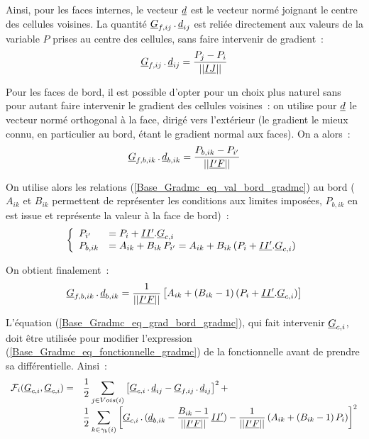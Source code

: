 Ainsi, pour les faces internes, le vecteur $\underline{d}$ est le vecteur norm\'e joignant
le centre des cellules voisines. La quantit\'e
$\underline{G}_{f,ij}\,.\,\underline{d}_{ij}$ est reli\'ee directement aux
valeurs de la variable $P$ prises au centre des cellules, sans faire intervenir
de gradient~: 
\begin{equation}
\underline{G}_{f,ij}\,.\,\underline{d}_{ij}=\frac{P_j-P_i}{||\underline{IJ}||}
\end{equation}

Pour les faces de bord, il est possible d'opter pour un choix plus naturel sans pour 
autant faire intervenir le gradient des cellules voisines~: on utilise pour
$\underline{d}$ le vecteur
norm\'e orthogonal \`a la face, dirig\'e vers l'ext\'erieur (le gradient le
mieux connu, en particulier au bord, \'etant le gradient normal aux faces). 
On a alors~:
\begin{equation}
\underline{G}_{f,b,ik}\,.\,\underline{d}_{b,ik}=\frac{P_{b,ik}-P_{i'}}{||\underline{I'F}||}
\end{equation} 

On utilise alors les relations (\ref{Base_Gradmc_eq_val_bord_gradmc}) au bord ($A_{ik}$ et $B_{ik}$ 
permettent de
repr\'esenter les conditions aux limites impos\'ees, $P_{b,ik}$ en est issue et
repr\'esente la valeur \`a la face de bord)~:
\begin{equation}
\left\{\begin{array}{ll}\label{Base_Gradmc_eq_val_bord_gradmc}
P_{i'}&=P_{i}+\underline{II'}.\underline{G}_{c,i}\\
P_{b,ik}&=A_{ik}+B_{ik}\,P_{i'}=A_{ik}+B_{ik}\,(P_{i}+\underline{II'}.\underline{G}_{c,i})
\end{array}\right.
\end{equation}

On obtient finalement~:
\begin{equation}\label{Base_Gradmc_eq_grad_bord_gradmc}
\underline{G}_{f,b,ik}\,.\,\underline{d}_{b,ik}
=\frac{1}{||\underline{I'F}||}\left[A_{ik}+(B_{ik}-1)\,(P_{i}+\underline{II'}.\underline{G}_{c,i})\right]
\end{equation}

L'\'equation (\ref{Base_Gradmc_eq_grad_bord_gradmc}), qui fait intervenir $\underline{G}_{c,i}$, 
doit \^etre utilis\'ee pour modifier
l'expression (\ref{Base_Gradmc_eq_fonctionnelle_gradmc}) de la fonctionnelle avant de prendre sa 
diff\'erentielle. Ainsi~:
\begin{equation}\label{Base_Gradmc_eq_fonctionnelle_mod_gradmc}
\begin{array}{ll}
\mathcal{F}_i(\underline{G}_{c,i},\underline{G}_{c,i})=&
\displaystyle\frac{1}{2}\sum\limits_{j\in Vois(i)}\left[
\underline{G}_{c,i}\,.\,\underline{d}_{ij}-\underline{G}_{f,ij}\,.\,\underline{d}_{ij}
\right]^2+\\
&\displaystyle\frac{1}{2}\sum\limits_{k\in \gamma_b(i)}\left[
\underline{G}_{c,i}\,.\,(\underline{d}_{b,ik}-\frac{B_{ik}-1}{||\underline{I'F}||}\,\underline{II'})
-\frac{1}{||\underline{I'F}||}\left(A_{ik}+(B_{ik}-1)\,P_{i}\right)
\right]^2
\end{array}
\end{equation}





